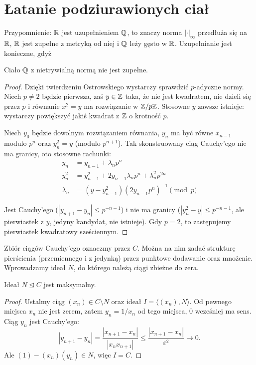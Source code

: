 \section{Łatanie podziurawionych ciał}
Przypomnienie: $\mathbb R$ jest uzupełnieniem $\mathbb Q$, to znaczy norma $|\cdot|_\infty$ przedłuża się na $\mathbb R$, $\mathbb R$ jest zupełne z metryką od niej i $\mathbb Q$ leży gęsto w $\mathbb R$. Uzupełnianie jest konieczne, gdyż

\begin{lemat}
	Ciało $\mathbb Q$ z nietrywialną normą nie jest zupełne.
\end{lemat}

\begin{proof}
	Dzięki twierdzeniu Ostrowskiego wystarczy sprawdzić $p$-adyczne normy.
	Niech $p \neq 2$ będzie pierwsza, zaś $y \in \mathbb Z$ taka, że nie jest kwadratem, nie dzieli się przez $p$ i równanie $x^2 = y$ ma rozwiązanie w $\mathbb Z/p\mathbb Z$.
	Stosowne $y$ zawsze istnieje: wystarczy powiększyć jakiś kwadrat z $\mathbb Z$ o krotność $p$.
	
	Niech $y_0$ będzie dowolnym rozwiązaniem równania, $y_n$ ma być równe $x_{n-1}$ modulo $p^n$ oraz $y_n^2 = y$ (modulo $p^{n+1}$).
	Tak skonstruowany ciąg Cauchy'ego nie ma granicy, oto stosowne rachunki:
	\begin{align*}
		y_n & = y_{n-1} + \lambda_n p^n \\
		y_n^2 & = y_{n-1}^2 + 2 y_{n-1} \lambda_n p^n + \lambda_n^2 p^{2n} \\
		\lambda_n & = (y - y_{n-1}^2)(2y_{n-1} p^n)^{-1} \pmod p
	\end{align*}
	
	Jest Cauchy'ego ($|y_{n+1} - y_n| \le p^{-n-1}$) i nie ma granicy ($|y_n^2 - y| \le p^{-n-1}$, ale pierwiastek z $y$, jedyny kandydat, nie istnieje).
	Gdy $p = 2$, to zastępujemy pierwiastek kwadratowy sześciennym.
\end{proof}

Zbiór ciągów Cauchy'ego oznaczmy przez $C$.
Można na nim zadać strukturę pierścienia (przemiennego i z jedynką) przez punktowe dodawanie oraz mnożenie.
Wprowadzamy ideał $N$, do którego należą ciągi zbieżne do zera.

\begin{lemat}
	Ideał $N \trianglelefteq C$ jest maksymalny.
\end{lemat}

\begin{proof}
Ustalmy ciąg $(x_n) \in C \setminus N$ oraz ideał $I = \langle (x_n), N \rangle$.
Od pewnego miejsca $x_n$ nie jest zerem, zatem $y_n = 1/x_n$ od tego miejsca, $0$ wcześniej ma sens.
Ciąg $y_n$ jest Cauchy'ego:
\[
	|y_{n+1} - y_n| = \frac{|x_{n+1} - x_n|}{|x_nx_{n+1}|} \le \frac{|x_{n+1}-x_n|}{\varepsilon^2} \to 0.
\]
Ale $(1) - (x_n)(y_n) \in N$, więc $I = C$.
\end{proof}

